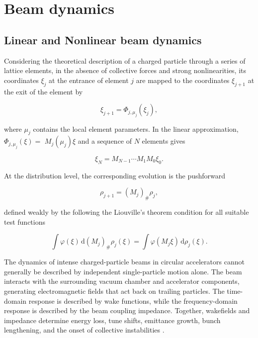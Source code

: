 
\chapter{Beam dynamics}
\label{sec:02_beam_dynamics_beam_dynamics}

\section{Linear and Nonlinear beam dynamics}
\label{sec:02_beam_dynamics_linear_and_nonlinear_beam_dynamics}

Considering the theoretical description of a charged particle through a series of lattice elements, in the absence of collective forces and strong nonlinearities, its coordinates \(\xi_{j}\) at the entrance of element \(j\) are mapped to the coordinates \(\xi_{j + 1}\) at the exit of the element by

\begin{equation}
\label{eq:4}
\xi_{j+1}=\Phi_{j,\mu_j}(\xi_j),
\end{equation}

where \(\mu_{j}\) contains the local element parameters. In the linear approximation, \(\Phi_{j , \mu_{j}} ( \xi ) =\) \(M_{j} ( \mu_{j} ) \xi\) and a sequence of \(N\) elements gives

\begin{equation}
\label{eq:5}
\xi_N=M_{N-1}\cdots M_1M_0\xi_0.
\end{equation}

At the distribution level, the corresponding evolution is the pushforward

\begin{equation}
\label{eq:6}
\rho_{j+1}=(M_j)_{\#}\rho_j,
\end{equation}

defined weakly by the following the Liouville’s theorem condition for all suitable test functions

\begin{equation}
\label{eq:7}
\int\varphi(\xi)\,\mathrm{d}(M_j)_{\#}\rho_j(\xi)=\int\varphi(M_j\xi)\,\mathrm{d}\rho_j(\xi).
\end{equation}

The dynamics of intense charged-particle beams in circular accelerators cannot generally be described by independent single-particle motion alone. The beam interacts with the surrounding vacuum chamber and accelerator components, generating electromagnetic fields that act back on trailing particles. The time-domain response is described by wake functions, while the frequency-domain response is described by the beam coupling impedance. Together, wakefields and impedance determine energy loss, tune shifts, emittance growth, bunch lengthening, and the onset of collective instabilities \cite{metral2021wake}.

